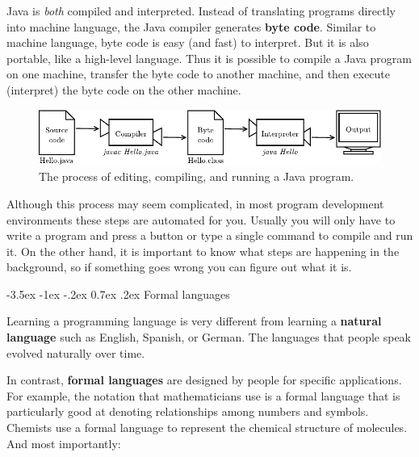 \documentclass[12pt]{book}
\makeatletter
\theoremstyle{exercise}
\renewcommand{\section}{\@startsection {section}{1}{\z@}%
    {-3.5ex \@plus -1ex \@minus -.2ex}%
    {0.7ex \@plus.2ex}%
    {\normalfont\Large\bfseries}}
\makeatother
\begin{document}

Java is {\em both} compiled and interpreted.
Instead of translating programs directly into machine language, the Java compiler generates {\bf byte code}.
Similar to machine language, byte code is easy (and fast) to interpret.
But it is also portable, like a high-level language.
Thus it is possible to compile a Java program on one machine, transfer the byte code to another machine, and then execute (interpret) the byte code on the other machine.

\begin{figure}[!h]
\begin{center}
\includegraphics{figs/compiler.pdf}
\caption{The process of editing, compiling, and running a Java program.}
\end{center}
\end{figure}

Although this process may seem complicated, in most program development environments these steps are automated for you.
Usually you will only have to write a program and press a button or type a single command to compile and run it.
On the other hand, it is important to know what steps are happening in the background, so if something goes wrong you can figure out what it is.


\section{Formal languages}


Learning a programming language is very different from learning a {\bf natural language} such as English, Spanish, or German.
The languages that people speak evolved naturally over time.


In contrast, {\bf formal languages} are designed by people for specific applications.
For example, the notation that mathematicians use is a formal language that is particularly good at denoting relationships among numbers and symbols.
Chemists use a formal language to represent the chemical structure of molecules.
And most importantly:
\end{document}
